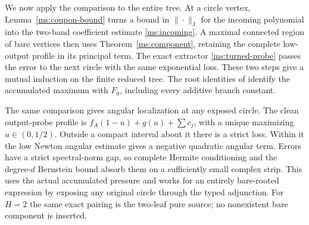 We now apply the comparison to the entire tree. At a circle vertex,
Lemma~\ref{ms:coupon-bound} turns a bound in $\|\cdot\|_{\mathrm J}$
for the incoming polynomial into the two-band coefficient estimate
\eqref{ms:incoming}. A maximal connected region of bare vertices
then uses Theorem~\ref{ms:component}, retaining the complete low-output
profile in its principal term. The exact extractor
\eqref{ms:turned-probe} passes the error to the next circle with the
same exponential loss. These two steps give a mutual induction on
the finite reduced tree. The root identities of
\cite[Corollary~7.5]{Newton} identify the accumulated maximum with
$F_0$, including every additive branch constant.

The same comparison gives angular localization at any exposed circle.
The clean output-probe profile is $f_A(1-u)+g(u)+\sum c_j$, with a
unique maximizing $u\in(0,1/2)$. Outside a compact interval about
it there is a strict loss. Within it the low Newton angular estimate
\cite[Lemma 7.2]{Bounds} gives a negative quadratic angular term.
Errors have a strict spectral-norm gap, so complete Hermite
conditioning and the degree-$d$ Bernstein bound absorb them on a
sufficiently small complex strip. This uses the actual accumulated
pressure and works for an entirely bare-rooted expression by
exposing any original circle through the typed adjunction. For
$H=2$ the same exact pairing is the two-leaf pure source; no
nonexistent bare component is inserted.
